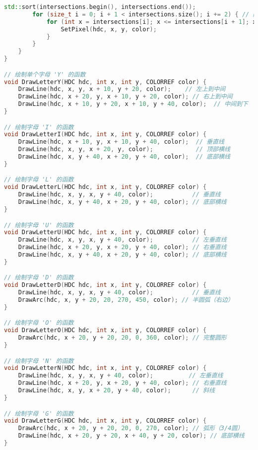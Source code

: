 \documentclass[11pt,a4paper]{article}
\begin{document}
\begin{lstlisting}[language=C++]
        std::sort(intersections.begin(), intersections.end());
        for (size_t i = 0; i + 1 < intersections.size(); i += 2) { // 防止越界
            for (int x = intersections[i]; x <= intersections[i + 1]; x++) {
                SetPixel(hdc, x, y, color);
            }
        }
    }
}

// 绘制单个字母 'Y' 的函数
void DrawLetterY(HDC hdc, int x, int y, COLORREF color) {
    DrawLine(hdc, x, y, x + 10, y + 20, color);    // 左上到中间
    DrawLine(hdc, x + 20, y, x + 10, y + 20, color); // 右上到中间
    DrawLine(hdc, x + 10, y + 20, x + 10, y + 40, color);  // 中间到下
}

// 绘制字母 'I' 的函数
void DrawLetterI(HDC hdc, int x, int y, COLORREF color) {
    DrawLine(hdc, x + 10, y, x + 10, y + 40, color);  // 垂直线
    DrawLine(hdc, x, y, x + 20, y, color);            // 顶部横线
    DrawLine(hdc, x, y + 40, x + 20, y + 40, color);  // 底部横线
}

// 绘制字母 'L' 的函数
void DrawLetterL(HDC hdc, int x, int y, COLORREF color) {
    DrawLine(hdc, x, y, x, y + 40, color);           // 垂直线
    DrawLine(hdc, x, y + 40, x + 20, y + 40, color); // 底部横线
}

// 绘制字母 'U' 的函数
void DrawLetterU(HDC hdc, int x, int y, COLORREF color) {
    DrawLine(hdc, x, y, x, y + 40, color);           // 左垂直线
    DrawLine(hdc, x + 20, y, x + 20, y + 40, color); // 右垂直线
    DrawLine(hdc, x, y + 40, x + 20, y + 40, color); // 底部横线
}

// 绘制字母 'D' 的函数
void DrawLetterD(HDC hdc, int x, int y, COLORREF color) {
    DrawLine(hdc, x, y, x, y + 40, color);           // 垂直线
    DrawArc(hdc, x, y + 20, 20, 270, 450, color); // 半圆弧（右边）
}

// 绘制字母 'O' 的函数
void DrawLetterO(HDC hdc, int x, int y, COLORREF color) {
    DrawArc(hdc, x + 20, y + 20, 20, 0, 360, color); // 完整圆形
}

// 绘制字母 'N' 的函数
void DrawLetterN(HDC hdc, int x, int y, COLORREF color) {
    DrawLine(hdc, x, y, x, y + 40, color);          // 左垂直线
    DrawLine(hdc, x + 20, y, x + 20, y + 40, color); // 右垂直线
    DrawLine(hdc, x, y, x + 20, y + 40, color);      // 斜线
}

// 绘制字母 'G' 的函数
void DrawLetterG(HDC hdc, int x, int y, COLORREF color) {
    DrawArc(hdc, x + 20, y + 20, 20, 0, 270, color); // 弧形（3/4圆）
    DrawLine(hdc, x + 20, y + 20, x + 40, y + 20, color); // 底部横线
}


\end{lstlisting}
\end{document}
